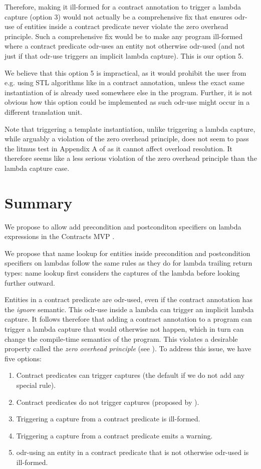 Therefore, making it ill-formed for a contract annotation to trigger a lambda capture (option 3) would not actually be a comprehensive fix that ensures odr-use of entities inside a contract predicate never violate the zero overhead principle. Such a comprehensive fix would be to make any program ill-formed where a contract predicate odr-uses an entity not otherwise odr-used (and not just if that odr-use triggers an implicit lambda capture). This is our option 5.

We believe that this option 5 is impractical, as it would prohibit the user from e.g. using STL algorithms like  in a contract annotation, unless the exact same instantiation of \mbox{} is already used somewhere else in the program. Further, it is not obvious how this option could be implemented as such odr-use might occur in a different translation unit.

Note that triggering a template instantiation, unlike triggering a lambda capture, while arguably a violation of the zero overhead principle, does not seem to pass the litmus test in Appendix A of \cite{P2932R2} as it cannot affect overload resolution. It therefore seems like a less serious violation of the zero overhead principle than the lambda capture case.

\section{Summary}

We propose to allow add precondition and postconditon specifiers on lambda expressions in the Contracts MVP \cite{P2900R2}.

We propose that name lookup for entities inside precondition and postcondition specifiers on lambdas follow the same rules as they do for lambda trailing return types: name lookup first considers the captures of the lambda before looking further outward.

Entities in a contract predicate are odr-used, even if the contract annotation has the \emph{ignore} semantic. This odr-use inside a lambda can trigger an implicit lambda capture. It follows therefore that adding a contract annotation to a program can trigger a lambda capture that would otherwise not happen, which in turn can change the compile-time semantics of the program. This violates a desirable property called the \emph{zero overhead principle} (see \cite{P2932R2}). To address this issue, we have five options:

\begin{enumerate}
\item Contract predicates can trigger captures (the default if we do not add any special rule).
\item Contract predicates do not trigger captures (proposed by \cite{P2932R2}).
\item Triggering a capture from a contract predicate is ill-formed.
\item Triggering a capture from a contract predicate emits a warning.
\item odr-using an entity in a contract predicate that is not otherwise odr-used is ill-formed.
\end{enumerate}

